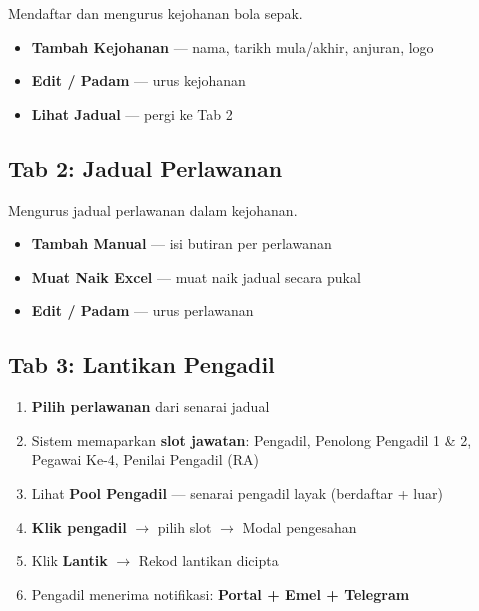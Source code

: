 \documentclass[12pt,a4paper]{report}
\newcommand{\btn}[1]{\colorbox{primaryblue!10}{\textcolor{primaryblue}{\textbf{#1}}}}
\begin{document}
Mendaftar dan mengurus kejohanan bola sepak.

\begin{itemize}[label=\textcolor{pbnpblue}{\faChevronRight}]
  \item \textbf{Tambah Kejohanan} --- nama, tarikh mula/akhir, anjuran, logo
  \item \textbf{Edit / Padam} --- urus kejohanan
  \item \textbf{Lihat Jadual} --- pergi ke Tab 2
\end{itemize}

\subsection{Tab 2: Jadual Perlawanan}

Mengurus jadual perlawanan dalam kejohanan.

\begin{itemize}[label=\textcolor{pbnpblue}{\faChevronRight}]
  \item \textbf{Tambah Manual} --- isi butiran per perlawanan
  \item \textbf{Muat Naik Excel} --- muat naik jadual secara pukal
  \item \textbf{Edit / Padam} --- urus perlawanan
\end{itemize}

\subsection{Tab 3: Lantikan Pengadil}

\begin{stepbox}
\begin{enumerate}[label=\textcolor{pbnpblue}{\textbf{\arabic*.}}, leftmargin=2em]
  \item \textbf{Pilih perlawanan} dari senarai jadual
  \item Sistem memaparkan \textbf{slot jawatan}: Pengadil, Penolong Pengadil 1 \& 2, Pegawai Ke-4, Penilai Pengadil (RA)
  \item Lihat \textbf{Pool Pengadil} --- senarai pengadil layak (berdaftar + luar)
  \item \textbf{Klik pengadil} $\rightarrow$ pilih slot $\rightarrow$ Modal pengesahan
  \item Klik \btn{Lantik} $\rightarrow$ Rekod lantikan dicipta
  \item Pengadil menerima notifikasi: \textbf{Portal + Emel + Telegram}
\end{enumerate}
\end{stepbox}
\end{document}
